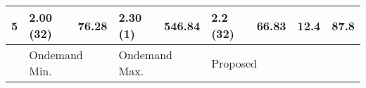 \begin{table}[H]
{\begin{tabular}{l|l|l|l|l|l|l|ll}
5     & 2.00  (32)                                                                       & 76.28              & 2.30 (1)                                                                         & 546.84             & 2.2 (32)                                                                     & 66.83              & \multicolumn{1}{l|}{12.4}                & 87.8                \\ \hline
      & \multicolumn{2}{l|}{Ondemand Min.}                                                                    & \multicolumn{2}{l|}{Ondemand Max.}                                                                    & \multicolumn{2}{l|}{Proposed}                                                                     &                                          &                    
\end{tabular}
}
\end{table}

